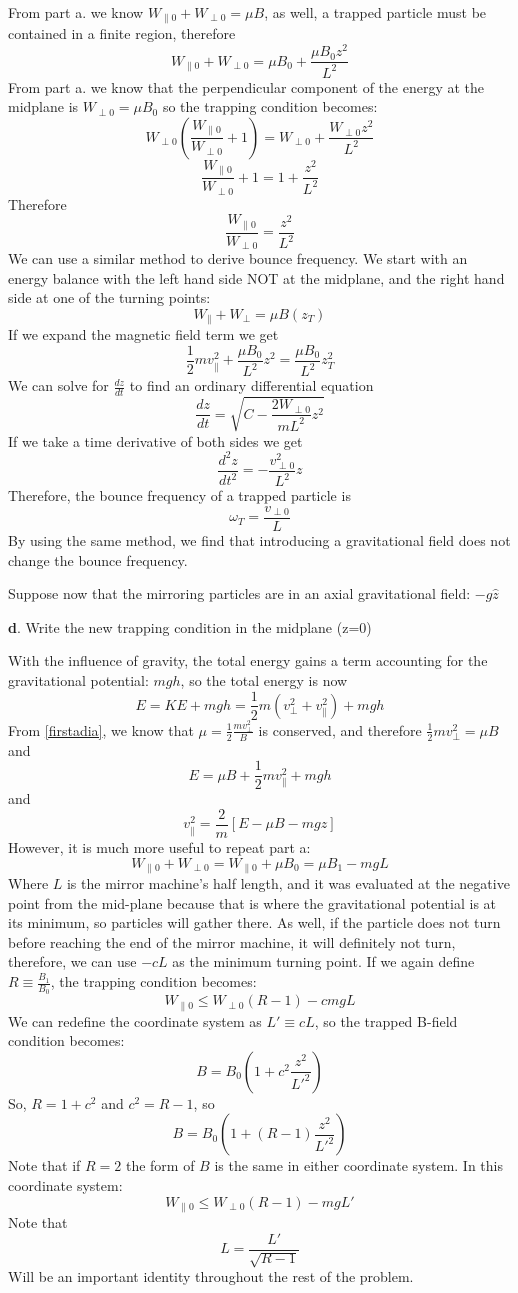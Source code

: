 \documentclass[12pt]{article}
\begin{document}
From part a. we know $W_{\parallel0}+W_{\perp0}=\mu B$, as well, a trapped particle must be contained in a finite region, therefore
$$W_{\parallel0}+W_{\perp0}=\mu B_0+\frac{\mu B_0 z^2}{L^2}$$
From part a. we know that the perpendicular component of the energy at the midplane is $W_{\perp0}=\mu B_0$ so the trapping condition becomes:
$$W_{\perp 0}\left(\frac{W_{\parallel0}}{W_{\perp0}}+1\right)=W_{\perp0}+\frac{W_{\perp0}z^2}{L^2}$$
$$\frac{W_{\parallel0}}{W_{\perp0}}+1=1+\frac{z^2}{L^2}$$
Therefore
$$\boxed{\frac{W_{\parallel0}}{W_{\perp0}}=\frac{z^2}{L^2}}$$
We can use a similar method to derive bounce frequency. We start with an energy balance with the left hand side NOT at the midplane, and the right hand side at one of the turning points:
$$W_{\parallel}+W_{\perp}=\mu B(z_T)$$
If we expand the magnetic field term we get
$$\frac{1}{2}mv_{\parallel}^2+\frac{\mu B_0}{L^2}z^2=\frac{\mu B_0}{L^2}z^2_T$$
We can solve for $\frac{dz}{dt}$ to find an ordinary differential equation
$$\frac{dz}{dt}=\sqrt{C-\frac{2W_{\perp 0}}{mL^2}z^2}$$
If we take a time derivative of both sides we get
$$\frac{d^2z}{dt^2}=-\frac{v_{\perp0}^2}{L^2}z$$
Therefore, the bounce frequency of a trapped particle is 
$$\omega_T=\frac{v_{\perp0}}{L}$$
By using the same method, we find that introducing a gravitational field does not change the bounce frequency.

\vspace{12mm}
Suppose now that the mirroring particles are in an axial gravitational field: $-g\hat{z}$

\noindent\textbf{d}. Write the new trapping condition in the midplane  (z=0)

With the influence of gravity, the total energy gains a term accounting for the gravitational potential: $mgh$, so the total energy is now
$$E=KE+mgh=\frac{1}{2}m(v_{\perp}^2+v_{\parallel}^2)+mgh$$
From \eqref{firstadia}, we know that $\mu=\frac{1}{2}\frac{mv_{\perp}^2}{B}$ is conserved, and therefore $\frac{1}{2}mv_{\perp}^2=\mu B$ and
$$E=\mu B +\frac{1}{2}mv_{\parallel}^2+mgh$$
and 
$$\boxed{v_{\parallel}^2=\frac{2}{m}[E-\mu B-mgz]}$$
However, it is much more useful to repeat part a:
$$W_{\parallel0}+W_{\perp0}=W_{\parallel0}+\mu B_0=\mu B_1-mgL$$
Where $L$ is the mirror machine's half length, and it was evaluated at the negative point from the mid-plane because that is where the gravitational potential is at its minimum, so particles will gather there. As well, if the particle does not turn before reaching the end of the mirror machine, it will definitely not turn, therefore, we can use $-cL$ as the minimum turning point. If we again define $R\equiv\frac{B_1}{B_0}$, the trapping condition becomes:
$$\boxed{W_{\parallel0}\leq W_{\perp0}(R-1)-cmgL}$$
We can redefine the coordinate system as $L'\equiv cL$, so the trapped B-field condition becomes:
$$B=B_0\left(1+c^2\frac{z^2}{L'^2}\right)$$
So, $R=1+c^2$ and $c^2=R-1$, so
$$B=B_0\left(1+(R-1)\frac{z^2}{L'^2}\right)$$
Note that if $R=2$ the form of $B$ is the same in either coordinate system. In this coordinate system:
$$\boxed{W_{\parallel0}\leq W_{\perp0}(R-1)-mgL'}$$
Note that 
$$L=\frac{L'}{\sqrt{R-1}}$$
Will be an important identity throughout the rest of the problem.
\end{document}
